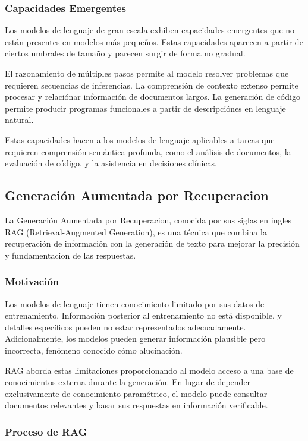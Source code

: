 \documentclass[12pt,a4paper,twoside]{book}
\begin{document}
\subsubsection{Capacidades Emergentes}

Los modelos de lenguaje de gran escala exhiben capacidades emergentes que no están presentes en modelos más pequeños. Estas capacidades aparecen a partir de ciertos umbrales de tamaño y parecen surgir de forma no gradual.

El razonamiento de múltiples pasos permite al modelo resolver problemas que requieren secuencias de inferencias. La comprensión de contexto extenso permite procesar y relaciónar información de documentos largos. La generación de código permite producir programas funcionales a partir de descripciónes en lenguaje natural.

Estas capacidades hacen a los modelos de lenguaje aplicables a tareas que requieren comprensión semántica profunda, como el análisis de documentos, la evaluación de código, y la asistencia en decisiones clínicas.

\subsection{Generación Aumentada por Recuperacion}

La Generación Aumentada por Recuperacion, conocida por sus siglas en ingles RAG (Retrieval-Augmented Generation), es una técnica que combina la recuperación de información con la generación de texto para mejorar la precisión y fundamentacion de las respuestas.

\subsubsection{Motivación}

Los modelos de lenguaje tienen conocimiento limitado por sus datos de entrenamiento. Información posterior al entrenamiento no está disponible, y detalles específicos pueden no estar representados adecuadamente. Adicionalmente, los modelos pueden generar información plausible pero incorrecta, fenómeno conocido cómo alucinación.

RAG aborda estas limitaciones proporcionando al modelo acceso a una base de conocimientos externa durante la generación. En lugar de depender exclusivamente de conocimiento paramétrico, el modelo puede consultar documentos relevantes y basar sus respuestas en información verificable.

\subsubsection{Proceso de RAG}
\end{document}
